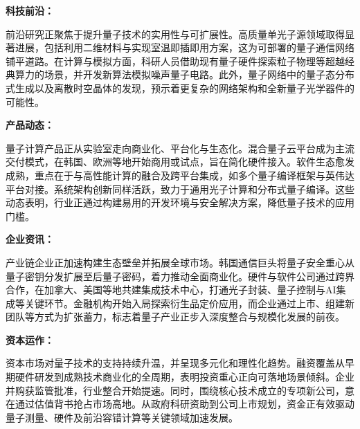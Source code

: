 \documentclass[12pt,a4paper]{ctexart}
\begin{document}
\textbf{ 科技前沿：}

前沿研究正聚焦于提升量子技术的实用性与可扩展性。高质量单光子源领域取得显著进展，包括利用二维材料与实现室温即插即用方案，这为可部署的量子通信网络铺平道路。在计算与模拟方面，科研人员借助现有量子硬件探索粒子物理等超越经典算力的场景，并开发新算法模拟噪声量子电路。此外，量子网络中的量子态分布式生成以及离散时空晶体的发现，预示着更复杂的网络架构和全新量子光学器件的可能性。


\textbf{ 产品动态：}

量子计算产品正从实验室走向商业化、平台化与生态化。混合量子云平台成为主流交付模式，在韩国、欧洲等地开始商用或试点，旨在简化硬件接入。软件生态愈发成熟，重点在于与高性能计算的融合及跨平台集成，如多个量子编译框架与英伟达平台对接。系统架构创新同样活跃，致力于通用光子计算和分布式量子编译。这些动态表明，行业正通过构建易用的开发环境与安全解决方案，降低量子技术的应用门槛。


\textbf{ 企业资讯：}

产业链企业正加速构建生态壁垒并拓展全球市场。韩国通信巨头将量子安全重心从量子密钥分发扩展至后量子密码，着力推动全面商业化。硬件与软件公司通过跨界合作，在加拿大、美国等地共建集成技术中心，打通光子封装、量子控制与AI集成等关键环节。金融机构开始入局探索衍生品定价应用，而企业通过上市、组建新团队等方式为扩张蓄力，标志着量子产业正步入深度整合与规模化发展的前夜。


\textbf{ 资本运作：}

资本市场对量子技术的支持持续升温，并呈现多元化和理性化趋势。融资覆盖从早期硬件研发到成熟技术商业化的全周期，表明投资重心正向可落地场景倾斜。企业并购获监管批准，行业整合开始提速。同时，围绕核心技术成立的专项新公司，意在通过估值背书抢占市场高地。从政府科研资助到公司上市规划，资金正有效驱动量子测量、硬件及前沿容错计算等关键领域加速发展。
\end{document}

